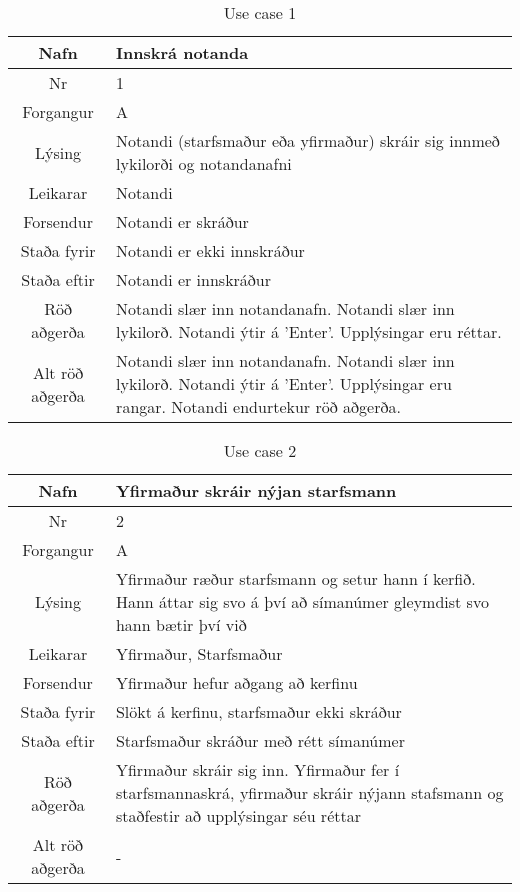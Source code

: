 \begin{table}[h!]\centering
\begin{tabular}{|c|p{10cm}|}
\hline
Nafn&Innskrá notanda\\
\hline
Nr&1\\
\hline
Forgangur&A\\
\hline
Lýsing&Notandi (starfsmaður eða yfirmaður) skráir sig innmeð lykilorði og notandanafni\\
\hline
Leikarar&Notandi\\
\hline
Forsendur&Notandi er skráður\\
\hline
Staða fyrir&Notandi er ekki innskráður\\
\hline
Staða eftir&Notandi er innskráður\\
\hline
Röð aðgerða&Notandi slær inn notandanafn. Notandi slær inn lykilorð. Notandi ýtir á ’Enter’. Upplýsingar eru réttar.\\
\hline
Alt röð aðgerða&Notandi slær inn notandanafn. Notandi slær inn lykilorð. Notandi ýtir á ’Enter’. Upplýsingar eru rangar. Notandi endurtekur röð aðgerða.\\
\hline
\end{tabular}
\caption{Use case 1}\label{tab:use_case_1}
\end{table}
\begin{table}[h!]\centering
\begin{tabular}{|c|p{10cm}|}
\hline
Nafn&Yfirmaður skráir nýjan starfsmann\\
\hline
Nr&2\\
\hline
Forgangur&A\\
\hline
Lýsing&Yfirmaður ræður starfsmann og setur hann í kerfið. Hann áttar sig svo á því að símanúmer gleymdist svo hann bætir því við\\
\hline
Leikarar&Yfirmaður, Starfsmaður\\
\hline
Forsendur&Yfirmaður hefur aðgang að kerfinu\\
\hline
Staða fyrir&Slökt á kerfinu, starfsmaður ekki skráður\\
\hline
Staða eftir&Starfsmaður skráður með rétt símanúmer\\
\hline
Röð aðgerða&Yfirmaður skráir sig inn. Yfirmaður fer í starfsmannaskrá, yfirmaður skráir nýjann stafsmann og staðfestir að upplýsingar séu réttar\\
\hline
Alt röð aðgerða&-\\
\hline
\end{tabular}
\caption{Use case 2}\label{tab:use_case_2}
\end{table}
